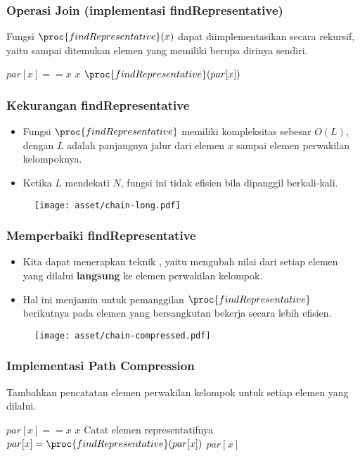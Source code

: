 \begin{frame}
\frametitle{Operasi Join (implementasi findRepresentative)}
Fungsi $\proc{findRepresentative}(x)$ dapat diimplementasikan secara rekursif, yaitu sampai ditemukan elemen yang memiliki  berupa dirinya sendiri.

\begin{codebox}
\li \If $par[x] == x$ \Then
\li   \Return $x$
\li \Else
\li   \Return $\proc{findRepresentative}(par[x])$
    \End
\end{codebox}
\end{frame}

\begin{frame}
\frametitle{Kekurangan findRepresentative}
\begin{itemize}
  \item Fungsi $\proc{findRepresentative}$ memiliki kompleksitas sebesar $O(L)$, dengan $L$ adalah panjangnya jalur dari elemen $x$ sampai elemen perwakilan kelompoknya.
  \item Ketika $L$ mendekati $N$, fungsi ini tidak efisien bila dipanggil berkali-kali.
\end{itemize}
\begin{figure}
  \texttt{[image: asset/chain-long.pdf]}
\end{figure}
\end{frame}

\begin{frame}
\frametitle{Memperbaiki findRepresentative}
\begin{itemize}
  \item Kita dapat menerapkan teknik , yaitu mengubah nilai  dari setiap elemen yang dilalui \textbf{langsung} ke elemen perwakilan kelompok.
  \item Hal ini menjamin untuk pemanggilan $\proc{findRepresentative}$ berikutnya pada elemen yang bersangkutan bekerja secara lebih efisien.
\end{itemize}
\begin{figure}
  \texttt{[image: asset/chain-compressed.pdf]}
\end{figure}
\end{frame}

\begin{frame}
\frametitle{Implementasi Path Compression}
Tambahkan pencatatan elemen perwakilan kelompok untuk setiap elemen yang dilalui.
\begin{codebox}
\li \If $par[x] == x$ \Then
\li   \Return $x$
\li \Else
\li   \Comment Catat elemen representatifnya
\li   $par[x] = \proc{findRepresentative}(par[x])$ 
\li   \Return $par[x]$
    \End
\end{codebox}
\end{frame}

